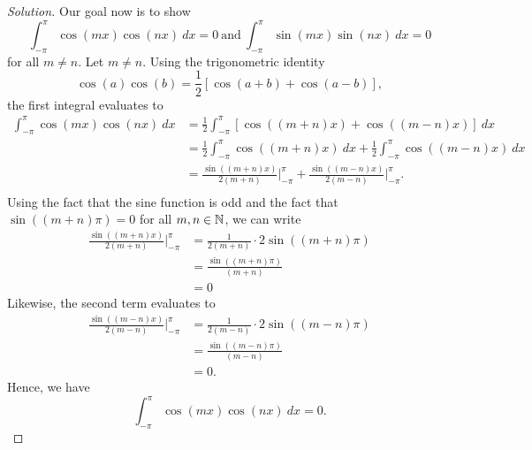 \begin{enumerate}
\begin{proof}[Solution]
        Our goal now is to show 
        \[  \int_{ - \pi  }^{ \pi  } \cos(mx) \cos(nx) \ dx = 0 \ \text{and} \ \int_{ -\pi  }^{ \pi  } \sin(mx) \sin(nx)  \ dx = 0 \]
        for all \( m \neq n  \). Let \( m \neq  n \). Using the trigonometric identity 
        \[ \cos(a)\cos(b) = \frac{ 1 }{ 2 }  [ \cos(a+b ) + \cos(a-b)],   \]
        the first integral evaluates to
        \begin{align*}
            \int_{ -\pi  }^{ \pi } \cos(mx) \cos(nx) \ dx  &= \frac{ 1 }{ 2 } \int_{ - \pi  }^{ \pi  } [ \cos((m+n)x) + \cos((m-n)x) ]  \ dx \\
                                                           &= \frac{ 1 }{ 2 } \int_{ - \pi  }^{ \pi  } \cos((m+n)x)  \ dx + \frac{ 1 }{ 2 }  \int_{ - \pi  }^{ \pi  } \cos((m-n)x) \ dx  \\
                                                           &= \frac{ \sin((m+n)x) }{ 2(m+n) }  \Big|_{-\pi}^{\pi} + \frac{ \sin((m-n)x) }{ 2(m-n) } \Big|_{- \pi}^{\pi}. \\
        \end{align*}
        Using the fact that the sine function is odd and the fact that \( \sin((m+n) \pi) = 0  \) for all \( m, n \in \mathbb{N}  \), we can write     
        \begin{align*}
            \frac{ \sin((m+n)x) }{ 2(m+n) }  \Big|_{-\pi}^{\pi} &= \frac{ 1 }{ 2(m+n)  } \cdot  2\sin((m+n)\pi)  \\
                                                                &= \frac{ \sin((m+n)\pi) }{ (m+n) } \\
                                                                &= 0
        \end{align*}
       Likewise, the second term evaluates to  
       \begin{align*} 
           \frac{ \sin((m-n)x) }{ 2(m-n) } \Big|_{- \pi}^{\pi} &= \frac{ 1 }{ 2(m-n) } \cdot 2\sin((m-n)\pi) \\
                                                               &= \frac{ \sin((m-n)\pi) }{ (m-n)  }   \\
                                                               &= 0.
      \end{align*}
      Hence, we have 
      \[  \int_{ -\pi  }^{ \pi  } \cos(mx) \cos(nx)  \ dx = 0. \]
      

\end{proof}
\end{enumerate}
